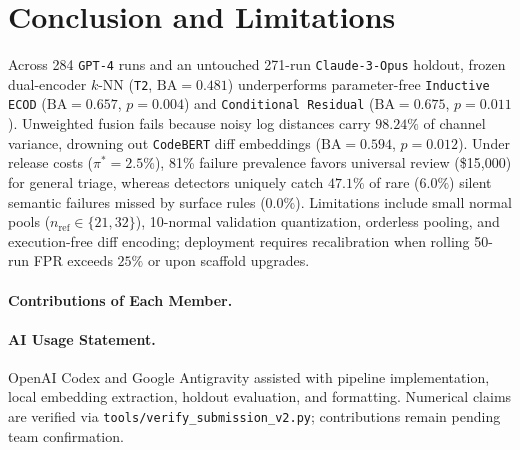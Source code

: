 \section{Conclusion and Limitations}
Across 284 \texttt{GPT-4} runs and an untouched 271-run \texttt{Claude-3-Opus} holdout, frozen dual-encoder $k$-NN (\texttt{T2}, $\mathrm{BA}=0.481$) underperforms parameter-free \texttt{Inductive ECOD} ($\mathrm{BA}=0.657$, $p=0.004$) and \texttt{Conditional Residual} ($\mathrm{BA}=0.675$, $p=0.011$). Unweighted fusion fails because noisy log distances carry $98.24\%$ of channel variance, drowning out \texttt{CodeBERT} diff embeddings ($\mathrm{BA}=0.594$, $p=0.012$). Under release costs ($\pi^*=2.5\%$), 81\% failure prevalence favors universal review (\$15,000) for general triage, whereas detectors uniquely catch $47.1\%$ of rare ($6.0\%$) silent semantic failures missed by surface rules ($0.0\%$). Limitations include small normal pools ($n_{\text{ref}}\in\{21,32\}$), 10-normal validation quantization, orderless pooling, and execution-free diff encoding; deployment requires recalibration when rolling 50-run FPR exceeds $25\%$ or upon scaffold upgrades.

\paragraph{Contributions of Each Member.}
\begin{itemize}[noitemsep,topsep=0pt,partopsep=0pt,parsep=0pt]\end{itemize}
\paragraph{AI Usage Statement.}
OpenAI Codex and Google Antigravity assisted with pipeline implementation, local embedding extraction, holdout evaluation, and formatting. Numerical claims are verified via \texttt{tools/verify\_submission\_v2.py}; contributions remain pending team confirmation.
